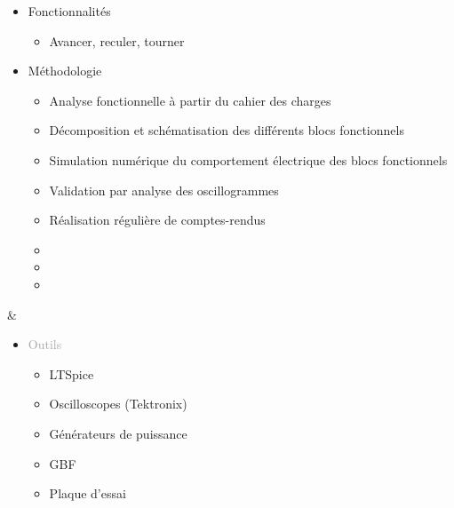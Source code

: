 \documentclass{article}
\begin{document}
\begin{tabular}
\begin{itemize}
\begin{itemize}
            \item \textcolor{gray!100}{Fonctionnalités}
            \begin{itemize}
                [label={\textcolor{gray!100}{$\triangleright$}}, topsep=0pt, partopsep=0pt, itemsep=0.5pt, parsep=2pt]
                \item \textcolor{gray!100}{Avancer, reculer, tourner}
            \end{itemize}
            \item \textcolor{gray!100}{Méthodologie}       
            \begin{itemize}
                [label={\textcolor{gray!100}{$\triangleright$}}, topsep=0pt, partopsep=0pt, itemsep=0.5pt, parsep=2pt]
                \item \textcolor{gray!100}{Analyse fonctionnelle à partir du cahier des charges}
                \item \textcolor{gray!100}{Décomposition et schématisation des différents blocs fonctionnels}
                \item \textcolor{gray!100}{Simulation numérique du comportement électrique des blocs fonctionnels}
                \item \textcolor{gray!100}{Validation par analyse des oscillogrammes}  
                \item \textcolor{gray!100}{Réalisation régulière de comptes-rendus}
                \item[\textcolor{white}{}] {} %
                \item[\textcolor{white}{}] {} %
                \item[\textcolor{white}{}] {} %
            \end{itemize}
        \end{itemize}
    \end{itemize}
    &
    \begin{itemize}
        [label={}, topsep=8pt, partopsep=0pt, itemsep=0.5pt, parsep=2pt]
        \setlength{\itemsep}{10pt}
        \item \textcolor{darkGray}{Outils}
        \begin{itemize}
        [label={\textcolor{gray!100}{\checkmark}}, topsep=8pt, partopsep=0pt, itemsep=0.5pt, parsep=2pt] 
            
            \item \textcolor{gray!100}{LTSpice}
            \item \textcolor{gray!100}{Oscilloscopes (Tektronix)}
            \item \textcolor{gray!100}{Générateurs de puissance}
            \item \textcolor{gray!100}{GBF}
            \item \textcolor{gray!100}{Plaque d'essai}


\end{itemize}
\end{itemize}
\end{tabular}
\end{document}

